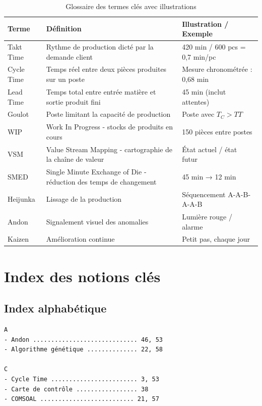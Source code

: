 \documentclass[12pt,a4paper]{article}
\begin{document}
\begin{center}
\begin{table}[H]
\centering
\caption{Glossaire des termes clés avec illustrations}
\label{tab:glossaire_final}
\begin{tabular}{|p{3cm}|p{5cm}|p{5cm}|}
\hline
\textbf{Terme} & \textbf{Définition} & \textbf{Illustration / Exemple} \\ \hline
Takt Time & Rythme de production dicté par la demande client & 420 min / 600 pcs = 0,7 min/pc \\ \hline
Cycle Time & Temps réel entre deux pièces produites sur un poste & Mesure chronométrée : 0,68 min \\ \hline
Lead Time & Temps total entre entrée matière et sortie produit fini & 45 min (inclut attentes) \\ \hline
Goulot & Poste limitant la capacité de production & Poste avec \(T_C > TT\) \\ \hline
WIP & Work In Progress - stocks de produits en cours & 150 pièces entre postes \\ \hline
VSM & Value Stream Mapping - cartographie de la chaîne de valeur & État actuel / état futur \\ \hline
SMED & Single Minute Exchange of Die - réduction des temps de changement & 45 min → 12 min \\ \hline
Heijunka & Lissage de la production & Séquencement A-A-B-A-A-B \\ \hline
Andon & Signalement visuel des anomalies & Lumière rouge / alarme \\ \hline
Kaizen & Amélioration continue & Petit pas, chaque jour \\ \hline
\end{tabular}
\end{table}

\section{Index des notions clés}

\subsection{Index alphabétique}

\begin{verbatim}
A
- Andon ............................. 46, 53
- Algorithme génétique .............. 22, 58

C
- Cycle Time ........................ 3, 53
- Carte de contrôle ................. 38
- COMSOAL .......................... 21, 57


\end{verbatim}
\end{center}
\end{document}
